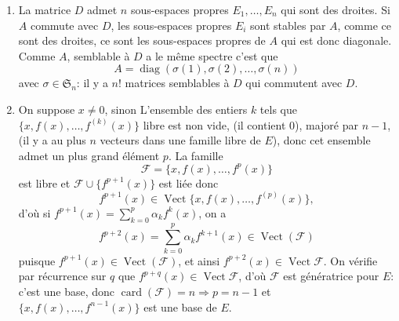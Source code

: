 \begin{enumerate}[label=\arabic*.,leftmargin=2.2em,itemsep=1.1em]
Densité de $GL_n(\mathbb C)$ dans $M_n(\mathbb C)$: si la matrice carrée $B$ est telle que $\det B=0$, c'est que 0 est racine de $\chi_B(\lambda)=\det(B-\lambda I_n)$, mais les zéros d'un polynôme étant isolés, $\exists\alpha>0$ tel que $\forall z$, $0<|z|<\alpha\Rightarrow B-zI_n$ inversible, et
\[
\lim_{z\to0}(B-zI_n)=B.
\]

\item La matrice $D$ admet $n$ sous-espaces propres $E_1,\ldots,E_n$ qui sont des droites.
Si $A$ commute avec $D$, les sous-espaces propres $E_i$ sont stables par $A$, comme ce sont des droites, ce sont les sous-espaces propres de $A$ qui est donc diagonale. Comme $A$, semblable à $D$ a le même spectre c'est que
\[
A=\operatorname{diag}(\sigma(1),\sigma(2),\ldots,\sigma(n))
\]
avec $\sigma\in\mathfrak S_n$: il y a $n!$ matrices semblables à $D$ qui commutent avec $D$.

\item On suppose $x\ne0$, sinon  L'ensemble des entiers $k$ tels que $\{x,f(x),\ldots,f^{(k)}(x)\}$ libre est non vide, (il contient 0), majoré par $n-1$, (il y a au plus $n$ vecteurs dans une famille libre de $E$), donc cet ensemble admet un plus grand élément $p$. La famille
\[
\mathcal F=\{x,f(x),\ldots,f^p(x)\}
\]
est libre et $\mathcal F\cup\{f^{p+1}(x)\}$ est liée donc
\[
f^{p+1}(x)\in\operatorname{Vect}\{x,f(x),\ldots,f^{(p)}(x)\},
\]
d'où si $f^{p+1}(x)=\sum_{k=0}^p\alpha_kf^k(x)$, on a
\[
f^{p+2}(x)=\sum_{k=0}^p\alpha_kf^{k+1}(x)\in\operatorname{Vect}(\mathcal F)
\]
puisque $f^{p+1}(x)\in\operatorname{Vect}(\mathcal F)$, et ainsi $f^{p+2}(x)\in\operatorname{Vect}\mathcal F$. On vérifie par récurrence sur $q$ que $f^{p+q}(x)\in\operatorname{Vect}\mathcal F$, d'où $\mathcal F$ est génératrice pour $E$: c'est une base, donc $\operatorname{card}(\mathcal F)=n\Rightarrow p=n-1$ et $\{x,f(x),\ldots,f^{n-1}(x)\}$ est une base de $E$.


\end{enumerate}
